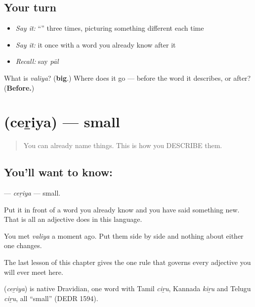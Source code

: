 \subsection*{Your turn}
\begin{itemize}
\raggedright
  \item \emph{Say it:} \textquotedblleft{}\textquotedblright{} three times, picturing something different each time
  \item \emph{Say it:} it once with a word you already know after it
  \item \emph{Recall:} say \emph{pāl}
\end{itemize}

\begin{tcolorbox}[breakable,colback=teal!4,colframe=teal!35!black,title={Before you move on}]
What is \emph{valiya}? (\textbf{big}.) Where does it go — before the word it describes, or after? (\textbf{Before.})
\end{tcolorbox}
\section[\texorpdfstring{\ml{ചെറിയ} (ceṟiya)}{ചെറിയ (ceṟiya)}]{ (ceṟiya) — small}

\label{lesson:ML-C42-small}



\begin{quote}
You can already name things. This is how you DESCRIBE them.
\end{quote}

\subsection*{You'll want to know: }
\textbf{} — \emph{ceṟiya} — small.

Put it in front of a word you already know and you have said something new. That is all an adjective does in this language.

You met \textbf{} \emph{valiya} a moment ago. Put them side by side and nothing about either one changes.

The last lesson of this chapter gives the one rule that governs every adjective you will ever meet here.

\begin{cousinweb}
\textbf{} (\emph{ceṟiya}) is native Dravidian, one word with Tamil \emph{ciṟu}, Kannada \emph{kiṟu} and Telugu \emph{ciṟu}, all \textquotedblleft{}small\textquotedblright{} (DEDR 1594).
\end{cousinweb}

